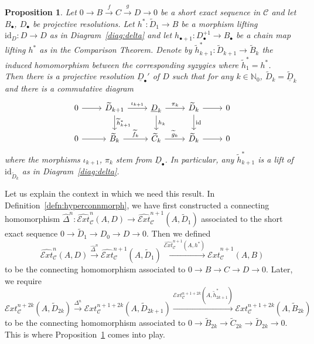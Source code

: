 \documentclass[12pt,a4paper]{article}
\numberwithin{equation}{section}
\newtheorem{prop}[thm]{Proposition}
\theoremstyle{nonumberplain}
\begin{document}
\begin{prop}\label{prop:syzygyislift}
Let $0 \rightarrow B \xrightarrow{f} C \xrightarrow{g} D \rightarrow 0$ be a short exact sequence in $\mathcal{C}$ and let $B_{\bullet}$, $D_{\bullet}$ be projective resolutions. Let $h^{\ast}: \widetilde{D}_1 \rightarrow B$ be a morphism lifting $\mathrm{id}_D: D \rightarrow D$ as in Diagram~\ref{diag:delta} and let $h_{\bullet+1}: D_{\bullet}^{+1} \rightarrow B_{\bullet}$ be a chain map lifting $h^{\ast}$ as in the Comparison Theorem. Denote by $\widetilde{h}_{k+1}^{\ast}: \widetilde{D}_{k+1} \rightarrow \widetilde{B}_k$ the induced homomorphism between the corresponding syzygies where $\widetilde{h}_1^{\ast} = h^{\ast}$. \\

Then there is a projective resolution $\underline{D}_{\bullet}'$ of $D$ such that for any $k \in \mathbb{N}_0$, $\widetilde{D}_k = \widetilde{\underline{D}}_k$ and there is a commutative diagram
\begin{equation}\label{diag:syzygyislift}
\begin{tikzcd}
    0 \arrow[r] & \widetilde{D}_{k+1} \arrow[r, "\iota_{k+1}"] \arrow[d, "\widetilde{h}_{k+1}^{\ast}"] & \underline{D}_k \arrow[r, "\pi_k"] \arrow[d, "h_k"] & \widetilde{D}_k \arrow[r] \arrow[d, "\mathrm{id}"] & 0 \\
    0 \arrow[r] & \widetilde{B}_k \arrow[r, "\widetilde{f}_k"] & \widetilde{C}_k \arrow[r, "\widetilde{g}_k"] & \widetilde{D}_k \arrow[r] & 0
\end{tikzcd}
\end{equation}
where the morphisms $\iota_{k+1}$, $\pi_k$ stem from $\underline{D}_{\bullet}$. In particular, any $\widetilde{h}_{k+1}^{\ast}$ is a lift of $\mathrm{id}_{\widetilde{D}_k}$ as in Diagram~\ref{diag:delta}.
\end{prop}

Let us explain the context in which we need this result. In Definition~\ref{defn:hyperconnmorph}, we have first constructed a connecting homomorphism $\widehat{\Delta}^n: \widehat{\mathcal{E}xt}_{\mathcal{C}}^n(A, D) \rightarrow \widehat{\mathcal{E}xt}_{\mathcal{C}}^{n+1}(A, \widetilde{D}_1)$ associated to the short exact sequence $0 \rightarrow \widetilde{D}_1 \rightarrow D_0 \rightarrow D \rightarrow 0$. Then we defined
\[ \widehat{\mathcal{E}xt}_{\mathcal{C}}^n(A, D) \xrightarrow{\widehat{\Delta}^n} \widehat{\mathcal{E}xt}_{\mathcal{C}}^{n+1}(A, \widetilde{D}_1) \xrightarrow{\widehat{\mathcal{E}xt}_{\mathcal{C}}^{n+1}(A, h^{\ast})} \widehat{\mathcal{E}xt}_{\mathcal{C}}^{n+1}(A, B) \]
to be the connecting homomorphism associated to $0 \rightarrow B \rightarrow C \rightarrow D \rightarrow 0$. Later, we require
\[ \mathcal{E}xt_{\mathcal{C}}^{n+2k}(A, \widetilde{D}_{2k}) \xrightarrow{\Delta^n} \mathcal{E}xt_{\mathcal{C}}^{n+1+2k}(A, \widetilde{D}_{2k+1}) \xrightarrow{\mathcal{E}xt_{\mathcal{C}}^{n+1+2k}(A, \widetilde{h}_{2k+1}^{\ast})} \mathcal{E}xt_{\mathcal{C}}^{n+1+2k}(A, \widetilde{B}_{2k}) \]
to be the connecting homomorphism associated to $0 \rightarrow \widetilde{B}_{2k} \rightarrow \widetilde{C}_{2k} \rightarrow \widetilde{D}_{2k} \rightarrow 0$. This is where Proposition~\ref{prop:syzygyislift} comes into play.
\end{document}
